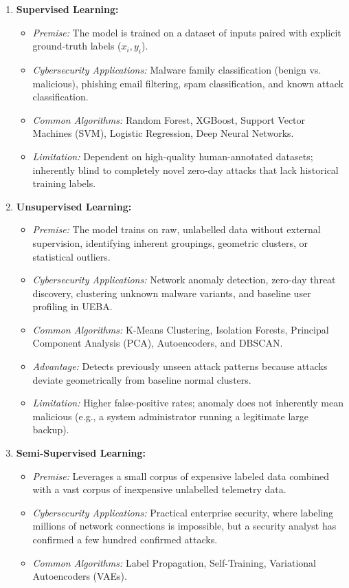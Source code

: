 \begin{enumerate}
\item \textbf{Supervised Learning:}
\begin{itemize}
\item \textit{Premise:} The model is trained on a dataset of inputs paired with explicit ground-truth labels ($x_i, y_i$).
\item \textit{Cybersecurity Applications:} Malware family classification (benign vs. malicious), phishing email filtering, spam classification, and known attack classification.
\item \textit{Common Algorithms:} Random Forest, XGBoost, Support Vector Machines (SVM), Logistic Regression, Deep Neural Networks.
\item \textit{Limitation:} Dependent on high-quality human-annotated datasets; inherently blind to completely novel zero-day attacks that lack historical training labels.
\end{itemize}

\item \textbf{Unsupervised Learning:}
\begin{itemize}
\item \textit{Premise:} The model trains on raw, unlabelled data without external supervision, identifying inherent groupings, geometric clusters, or statistical outliers.
\item \textit{Cybersecurity Applications:} Network anomaly detection, zero-day threat discovery, clustering unknown malware variants, and baseline user profiling in UEBA.
\item \textit{Common Algorithms:} K-Means Clustering, Isolation Forests, Principal Component Analysis (PCA), Autoencoders, and DBSCAN.
\item \textit{Advantage:} Detects previously unseen attack patterns because attacks deviate geometrically from baseline normal clusters.
\item \textit{Limitation:} Higher false-positive rates; anomaly does not inherently mean malicious (e.g., a system administrator running a legitimate large backup).
\end{itemize}

\item \textbf{Semi-Supervised Learning:}
\begin{itemize}
\item \textit{Premise:} Leverages a small corpus of expensive labeled data combined with a vast corpus of inexpensive unlabelled telemetry data.
\item \textit{Cybersecurity Applications:} Practical enterprise security, where labeling millions of network connections is impossible, but a security analyst has confirmed a few hundred confirmed attacks.
\item \textit{Common Algorithms:} Label Propagation, Self-Training, Variational Autoencoders (VAEs).
\end{itemize}


\end{enumerate}

